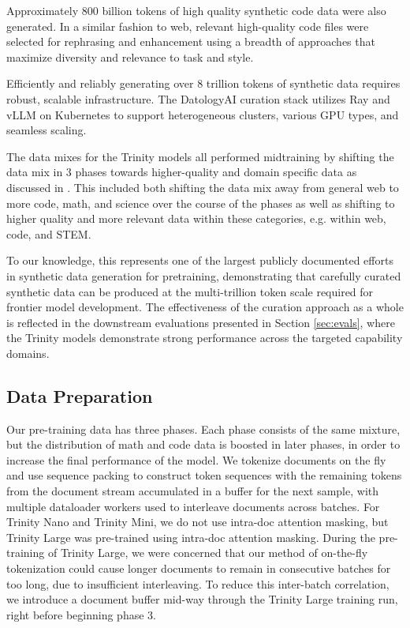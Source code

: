 \documentclass{article}
\begin{document}
Approximately 800 billion tokens of high quality synthetic code data were also generated. In a similar fashion to web, relevant high-quality code files were selected for rephrasing and enhancement using a breadth of approaches that maximize diversity and relevance to task and style.

Efficiently and reliably generating over 8 trillion tokens of synthetic data requires robust, scalable infrastructure. The DatologyAI curation stack utilizes Ray and vLLM on Kubernetes to support heterogeneous clusters, various GPU types, and seamless scaling.

The data mixes for the Trinity models all performed midtraining by shifting the data mix in 3 phases towards higher-quality and domain specific data as discussed in \citep{blakeney2024does, hu2024minicpm, olmo20252olmo2furious, allal2025smollm2}. This included both shifting the data mix away from general web to more code, math, and science over the course of the phases as well as shifting to higher quality and more relevant data within these categories, e.g. within web, code, and STEM.

To our knowledge, this represents one of the largest publicly documented efforts in synthetic data generation for pretraining, demonstrating that carefully curated synthetic data can be produced at the multi-trillion token scale required for frontier model development. The effectiveness of the curation approach as a whole is reflected in the downstream evaluations presented in Section \ref{sec:evals}, where the Trinity models demonstrate strong performance across the targeted capability domains.

\subsection{Data Preparation}

Our pre-training data has three phases. Each phase consists of the same mixture, but the distribution of math and code data is boosted in later phases, in order to increase the final performance of the model. We tokenize documents on the fly and use sequence packing to construct token sequences with the remaining tokens from the document stream accumulated in a buffer for the next sample, with multiple dataloader workers used to interleave documents across batches. For Trinity Nano and Trinity Mini, we do not use intra-doc attention masking, but Trinity Large was pre-trained using intra-doc attention masking. During the pre-training of Trinity Large, we were concerned that our method of on-the-fly tokenization could cause longer documents to remain in consecutive batches for too long, due to insufficient interleaving. To reduce this inter-batch correlation, we introduce a document buffer mid-way through the Trinity Large training run, right before beginning phase 3.
\end{document}
